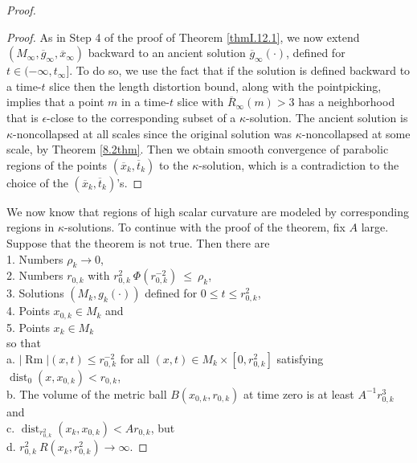 \documentclass[12pt]{amsart}
\newcommand{\dist}{\operatorname{dist}}
\newcommand{\Rm}{\operatorname{Rm}}
\numberwithin{equation}{section}
\theoremstyle{plain}
\theoremstyle{definition}
\theoremstyle{remark}
\begin{document}
\begin{proof}
\begin{proof}
As in Step 4 of the proof of Theorem \ref{thmI.12.1}, we now extend 
$(M_\infty,
\overline{g}_\infty, \overline{x}_\infty)$ backward to an ancient solution 
$\overline{g}_\infty(\cdot)$, defined for $t \in (-\infty, t_\infty]$.
To do so, we use the fact that if the solution
is defined backward to a time-$t$ slice then 
the length distortion bound, along with the pointpicking,
implies that a point $m$ in a time-$t$ slice with $\overline{R}_\infty(m)
> 3$ has a neighborhood that is $\epsilon$-close to the corresponding 
subset of a $\kappa$-solution. The ancient solution is $\kappa$-noncollapsed
at all scales since the original solution was $\kappa$-noncollapsed at
some scale, by Theorem \ref{8.2thm}.
Then we obtain smooth convergence
of parabolic regions of the points $(\overline{x}_k, \overline{t}_k)$ to
the $\kappa$-solution, which is a contradiction to the choice of the
$(\overline{x}_k, \overline{t}_k)$'s.
\end{proof}

We now know that regions of high scalar curvature are modeled by
corresponding
regions in $\kappa$-solutions. To continue with the proof of the theorem,
fix $A$ large. 
Suppose that the theorem is not true.  Then there are \\
1. Numbers $\rho_k \rightarrow 0$, \\
2. Numbers $r_{0,k}$ with 
$r_{0,k}^{2} \: \Phi(r_{0,k}^{-2}) \: \le \: \rho_k$, 
\\
3. Solutions
$(M_k, g_k(\cdot))$ defined for $0 \le t \le r_{0,k}^2$, \\
4. Points $x_{0,k} \in M_k$ and \\
5. Points $x_k \in M_k$\\
so that \\
a. $|\Rm|(x, t) \le r_{0,k}^{-2}$ for
all $(x, t) \in M_k \times [0, r_{0,k}^2]$ 
satisfying $\dist_0(x, x_{0,k}) < r_{0,k}$, \\
b. The volume of the metric ball $B(x_{0,k}, r_{0,k})$ at
time zero is at least $A^{-1} r_{0,k}^3$ and \\
c.  $\dist_{r_{0,k}^2}(x_k, x_{0,k}) <
A r_{0,k}$, but \\
d. $r_{0,k}^2 \: R(x_k, r_{0,k}^2) \rightarrow \infty$.


\end{proof}
\end{document}
